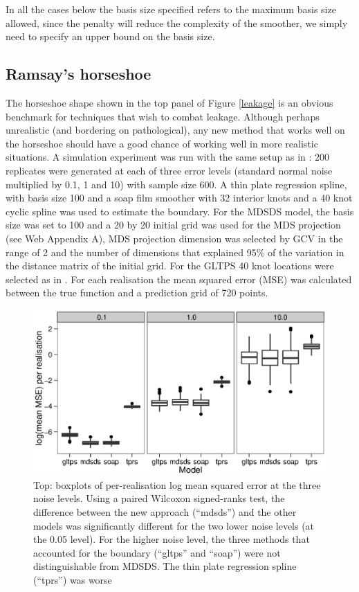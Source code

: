 \documentclass[smallextended]{svjour3}       %
\begin{document}
In all the cases below the basis size specified refers to the maximum basis size allowed, since the penalty will reduce the complexity of the smoother, we simply need to specify an upper bound on the basis size.


\subsection{Ramsay's horseshoe}

The horseshoe shape shown in the top panel of Figure \ref{leakage} is an obvious benchmark for techniques that wish to combat leakage. Although perhaps unrealistic (and bordering on pathological), any new method that works well on the horseshoe should have a good chance of working well in more realistic situations. A simulation experiment was run with the same setup as in \cite{Wood:2008vo}: 200 replicates were generated at each of three error levels (standard normal noise multiplied by 0.1, 1 and 10) with sample size 600. A thin plate regression spline, with basis size 100 and a soap film smoother with 32 interior knots  and a 40 knot cyclic  spline was used to estimate the boundary. For the MDSDS model, the basis size was set to 100 and a 20 by 20 initial grid was used for the MDS projection (see Web Appendix A), MDS projection dimension was selected by GCV in the range of 2 and the number of dimensions that explained 95\% of the variation in the distance matrix of the initial grid. For the GLTPS 40 knot locations were selected as in \cite{Wang:2007tf}. For each realisation the mean squared error (MSE) was calculated between the true function and a prediction grid of 720 points.

\begin{figure}
\centering
\includegraphics[width=\textwidth]{Fig4.eps}
\caption{Top: boxplots of per-realisation log mean squared error at the three noise levels. Using a paired Wilcoxon signed-ranks test, the difference between the new approach (``mdsds'') and the other models was significantly different for the two lower noise levels (at the 0.05 level). For the higher noise level, the three methods that accounted for the boundary (``gltps'' and ``soap'') were not distinguishable from MDSDS. The thin plate regression spline (``tprs'') was worse
\label{ramsay-results}}
\end{figure}
\end{document}
